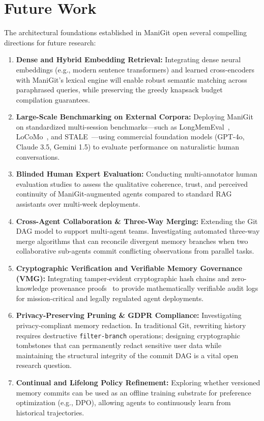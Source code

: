 \section{Future Work}
\label{sec:future_work}

The architectural foundations established in ManiGit open several compelling directions for future research:

\begin{enumerate}
    \item \textbf{Dense and Hybrid Embedding Retrieval:} Integrating dense neural embeddings (e.g., modern sentence transformers) and learned cross-encoders with ManiGit's lexical engine will enable robust semantic matching across paraphrased queries, while preserving the greedy knapsack budget compilation guarantees.
    \item \textbf{Large-Scale Benchmarking on External Corpora:} Deploying ManiGit on standardized multi-session benchmarks—such as LongMemEval~\cite{wu2024longmemeval}, LoCoMo~\cite{maharana2024locomo}, and STALE~\cite{stale2025benchmark}—using commercial foundation models (GPT-4o, Claude 3.5, Gemini 1.5) to evaluate performance on naturalistic human conversations.
    \item \textbf{Blinded Human Expert Evaluation:} Conducting multi-annotator human evaluation studies to assess the qualitative coherence, trust, and perceived continuity of ManiGit-augmented agents compared to standard RAG assistants over multi-week deployments.
    \item \textbf{Cross-Agent Collaboration & Three-Way Merging:} Extending the Git DAG model to support multi-agent teams. Investigating automated three-way merge algorithms that can reconcile divergent memory branches when two collaborative sub-agents commit conflicting observations from parallel tasks.
    \item \textbf{Cryptographic Verification and Verifiable Memory Governance (VMG):} Integrating tamper-evident cryptographic hash chains and zero-knowledge provenance proofs~\cite{zhou2025ltmsecurity} to provide mathematically verifiable audit logs for mission-critical and legally regulated agent deployments.
    \item \textbf{Privacy-Preserving Pruning & GDPR Compliance:} Investigating privacy-compliant memory redaction. In traditional Git, rewriting history requires destructive \texttt{filter-branch} operations; designing cryptographic tombstones that can permanently redact sensitive user data while maintaining the structural integrity of the commit DAG is a vital open research question.
    \item \textbf{Continual and Lifelong Policy Refinement:} Exploring whether versioned memory commits can be used as an offline training substrate for preference optimization (e.g., DPO), allowing agents to continuously learn from historical trajectories.
\end{enumerate}
